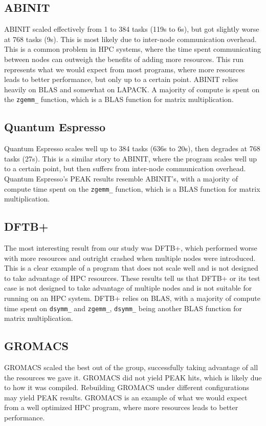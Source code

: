 \documentclass[conference]{IEEEtran}
\begin{document}
\subsection{ABINIT}
ABINIT scaled effectively from 1 to 384 tasks (119s to 6s), but got slightly worse at 768 tasks (9s). This is most likely due to inter-node communication overhead. This is a common problem in HPC systems, where the time spent communicating between nodes can outweigh the benefits of adding more resources. This run represents what we would expect from most programs, where more resources leads to better performance, but only up to a certain point. ABINIT relies heavily on BLAS and somewhat on LAPACK. A majority of compute is spent on the \texttt{zgemm\_} function, which is a BLAS function for matrix multiplication.

\subsection{Quantum Espresso}
Quantum Espresso scales well up to 384 tasks (636s to 20s), then degrades at 768 tasks (27s). This is a similar story to ABINIT, where the program scales well up to a certain point, but then suffers from inter-node communication overhead. Quantum Espresso's PEAK results resemble ABINIT's, with a majority of compute time spent on the \texttt{zgemm\_} function, which is a BLAS function for matrix multiplication.

\subsection{DFTB+}
The most interesting result from our study was DFTB+, which performed worse with more resources and outright crashed when multiple nodes were introduced. This is a clear example of a program that does not scale well and is not designed to take advantage of HPC resources. These results tell us that DFTB+ or its test case is not designed to take advantage of multiple nodes and is not suitable for running on an HPC system. DFTB+ relies on BLAS, with a majority of compute time spent on \texttt{dsymm\_} and \texttt{zgemm\_}, \texttt{dsymm\_} being another BLAS function for matrix multiplication.

\subsection{GROMACS}
GROMACS scaled the best out of the group, successfully taking advantage of all the resources we gave it. GROMACS did not yield PEAK hits, which is likely due to how it was compiled. Rebuilding GROMACS under different configurations may yield PEAK results. GROMACS is an example of what we would expect from a well optimized HPC program, where more resources leads to better performance.
\end{document}
